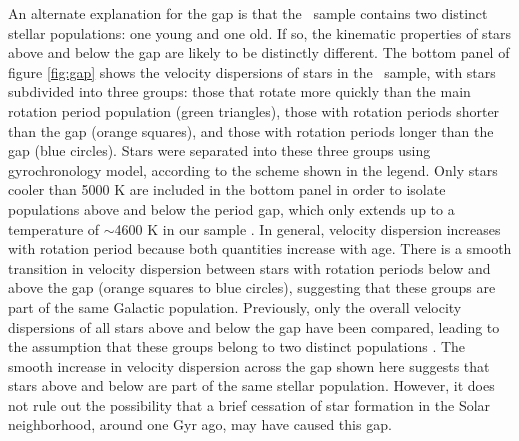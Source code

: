 An alternate explanation for the gap is that the \mct\ sample contains two
distinct stellar populations: one young and one old.
If so, the kinematic properties of stars above and below the gap are likely to
be distinctly different.
The bottom panel of figure \ref{fig:gap} shows the velocity dispersions of
stars in the \mct\ sample, with stars subdivided into three groups: those that
rotate more quickly than the main rotation period population (green
triangles), those with rotation periods shorter than the gap (orange squares),
and those with rotation periods longer than the gap (blue circles).
Stars were separated into these three groups using \citet{angus2019}
gyrochronology model, according to the scheme shown in the legend.
Only stars cooler than 5000 K are included in the bottom panel in order to
isolate populations above and below the period gap, which only extends up to a
temperature of $\sim$4600 K in our sample \citep[Although][found that the gap
extends to temperatures as hot as 6000 K]{davenport2017}.
In general, velocity dispersion increases with rotation period because both
quantities increase with age.
There is a smooth transition in velocity dispersion between stars with
rotation periods below and above the gap (orange squares to blue circles),
suggesting that these groups are part of the same Galactic population.
Previously, only the overall velocity dispersions of all stars above and below
the gap have been compared, leading to the assumption that these groups belong
to two distinct populations \citep{mcquillan2014}.
The smooth increase in velocity dispersion across the gap shown here suggests
that stars above and below are part of the same stellar population.
However, it does not rule out the possibility that a brief cessation of star
formation in the Solar neighborhood, around one Gyr ago, may have caused this
gap.

